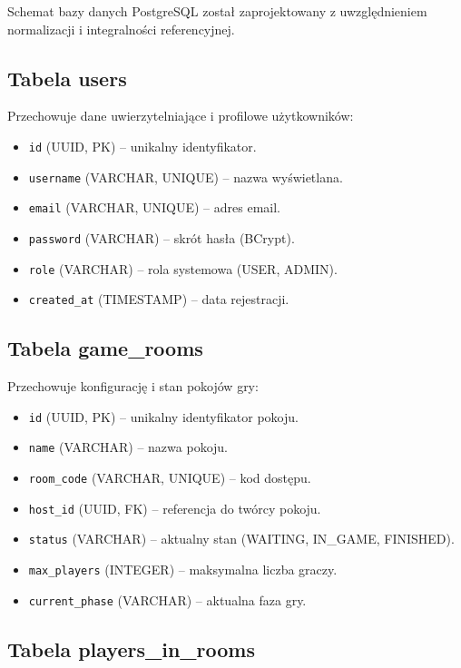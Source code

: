 ﻿\documentclass[a4paper,twoside,11pt]{mwrep}
\theoremstyle{plain} \newtheorem{thm}{Twierdzenie}
\theoremstyle{plain} \newtheorem{lem}{Lemat}
\theoremstyle{definition} \newtheorem{defn}{Definicja}
\theoremstyle{remark} \newtheorem*{rem}{Wniosek}
\begin{document}
Schemat bazy danych PostgreSQL został zaprojektowany z uwzględnieniem normalizacji i integralności referencyjnej.

\subsection{Tabela users}

Przechowuje dane uwierzytelniające i profilowe użytkowników:
\begin{itemize}
    \item \texttt{id} (UUID, PK) -- unikalny identyfikator.
    \item \texttt{username} (VARCHAR, UNIQUE) -- nazwa wyświetlana.
    \item \texttt{email} (VARCHAR, UNIQUE) -- adres email.
    \item \texttt{password} (VARCHAR) -- skrót hasła (BCrypt).
    \item \texttt{role} (VARCHAR) -- rola systemowa (USER, ADMIN).
    \item \texttt{created\_at} (TIMESTAMP) -- data rejestracji.
\end{itemize}

\subsection{Tabela game\_rooms}

Przechowuje konfigurację i stan pokojów gry:
\begin{itemize}
    \item \texttt{id} (UUID, PK) -- unikalny identyfikator pokoju.
    \item \texttt{name} (VARCHAR) -- nazwa pokoju.
    \item \texttt{room\_code} (VARCHAR, UNIQUE) -- kod dostępu.
    \item \texttt{host\_id} (UUID, FK) -- referencja do twórcy pokoju.
    \item \texttt{status} (VARCHAR) -- aktualny stan (WAITING, IN\_GAME, FINISHED).
    \item \texttt{max\_players} (INTEGER) -- maksymalna liczba graczy.
    \item \texttt{current\_phase} (VARCHAR) -- aktualna faza gry.
\end{itemize}

\subsection{Tabela players\_in\_rooms}
\end{document}
